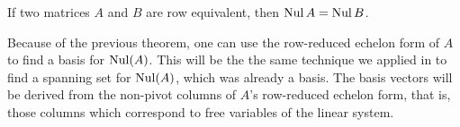 \begin{Thm}\label{thm:nulldimension} If two matrices $A$ and $B$ are row equivalent, then $\operatorname{Nul} A = \operatorname{Nul} B$.\\\end{Thm}

Because of the previous theorem, one can use the row-reduced echelon form of $A$ to find a basis for $\operatorname{Nul}(A)$. This will be the the same technique we applied in  to find a spanning set for $\operatorname{Nul}(A)$, which was already a basis. The basis vectors will be derived from the non-pivot columns of $A$'s row-reduced echelon form, that is, those columns which correspond to free variables of the linear system.\\

